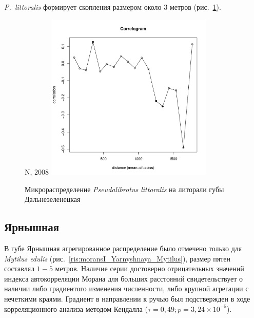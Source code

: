 {\it P.~littoralis} формирует скопления размером около $3$ метров (рис.~\ref{ris:moransI_Plyazh_Pseudalibrotus}).

	\begin{figure}[h]
	\begin{minipage}[b]{.5\linewidth}
	\begin{center}
	{\small N, $2008$}
		\includegraphics[width=80mm]{../Barenc_Sea/distribution_Moran/Plyazh0812_moran_N_Pseudolibrotus_littoralis_.pdf}
	\end{center}
	\end{minipage}

	\caption{Микрораспределение {\it Pseudalibrotus littoralis} на литорали губы Дальнезеленецкая}
	\label{ris:moransI_Plyazh_Pseudalibrotus}
	\end{figure}


\subsection{Ярнышная}
В губе Ярнышная агрегированное распределение было отмечено только для {\it Mytilus edulis} (рис.~\ref{ris:moransI_Yarnyshnaya_Mytilus}), размер пятен составлял $1 - 5$ метров. 
Наличие серии достоверно отрицательных значений индекса автокорреляции Морана для больших расстояний свидетельствует о наличии либо градиентого изменения численности, либо крупной агрегации с нечеткими краями.
Градиент в направлении к ручью был подствержден в ходе корреляционного анализа методом Кендалла ($\tau = 0,49; p = 3,24 \times 10^{-5}$).

